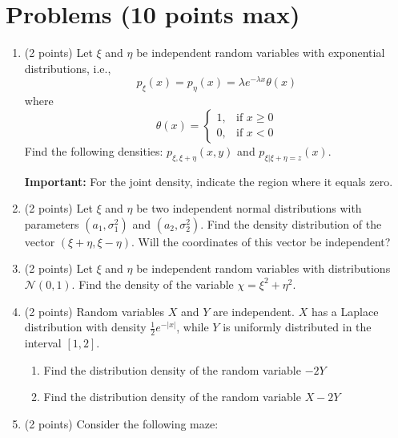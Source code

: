 \documentclass{article}
\begin{document}
\section*{Problems (10 points max)}

\begin{enumerate}
  \item (2 points) Let $\xi$ and $\eta$ be independent random variables with exponential distributions, i.e., $$p_\xi(x) = p_\eta(x) = \lambda e^{-\lambda x} \theta(x)$$ where
  \[
  \theta(x) = 
  \begin{cases} 
  1, & \text{if } x \geq 0 \\
  0, & \text{if } x < 0 
  \end{cases}
  \]
  Find the following densities: $p_{\xi,\xi+\eta}(x, y)$ and $p_{\xi|\xi+\eta=z}(x)$. 
  
  \textbf{Important:} For the joint density, indicate the region where it equals zero.
  
  \item (2 points) Let $\xi$ and $\eta$ be two independent normal distributions with parameters $(a_1, \sigma^2_1)$ and $(a_2, \sigma^2_2)$. Find the density distribution of the vector $(\xi + \eta, \xi - \eta)$. Will the coordinates of this vector be independent?
  
  \item (2 points) Let $\xi$ and $\eta$ be independent random variables with distributions $\mathcal{N}(0,1)$. Find the density of the variable $\chi = \xi^2 + \eta^2$.
  
  \item (2 points) Random variables $X$ and $Y$ are independent. $X$ has a Laplace distribution 
  with density $\frac{1}{2}e^{-|x|}$, while $Y$ is uniformly distributed in the interval $[1, 2]$.
  \begin{enumerate}
    \item Find the distribution density of the random variable $-2Y$
    \item Find the distribution density of the random variable $X - 2Y$
  \end{enumerate}
  
  \item (2 points) Consider the following maze:

  \begin{center}    
\end{center}
\end{enumerate}
\end{document}
